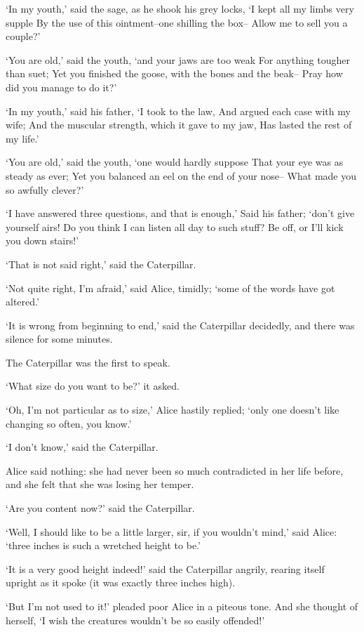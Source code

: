 \documentclass[statementpaper,twoside,openany]{memoir}
\begin{document}
`In my youth,' said the sage, as he shook his grey locks, `I kept all my limbs very supple By the use of this ointment--one shilling the box-- Allow me to sell you a couple?'

`You are old,' said the youth, `and your jaws are too weak For anything tougher than suet; Yet you finished the goose, with the bones and the beak-- Pray how did you manage to do it?'

`In my youth,' said his father, `I took to the law, And argued each case with my wife; And the muscular strength, which it gave to my jaw, Has lasted the rest of my life.'

`You are old,' said the youth, `one would hardly suppose That your eye was as steady as ever; Yet you balanced an eel on the end of your nose-- What made you so awfully clever?'

`I have answered three questions, and that is enough,' Said his father; `don't give yourself airs! Do you think I can listen all day to such stuff? Be off, or I'll kick you down stairs!'

`That is not said right,' said the Caterpillar.

`Not quite right, I'm afraid,' said Alice, timidly; `some of the words have got altered.'

`It is wrong from beginning to end,' said the Caterpillar decidedly, and there was silence for some minutes.

The Caterpillar was the first to speak.

`What size do you want to be?' it asked.

`Oh, I'm not particular as to size,' Alice hastily replied; `only one doesn't like changing so often, you know.'

`I don't know,' said the Caterpillar.

Alice said nothing: she had never been so much contradicted in her life before, and she felt that she was losing her temper.

`Are you content now?' said the Caterpillar.

`Well, I should like to be a little larger, sir, if you wouldn't mind,' said Alice: `three inches is such a wretched height to be.'

`It is a very good height indeed!' said the Caterpillar angrily, rearing itself upright as it spoke (it was exactly three inches high).

`But I'm not used to it!' pleaded poor Alice in a piteous tone. And she thought of herself, `I wish the creatures wouldn't be so easily offended!'
\end{document}
